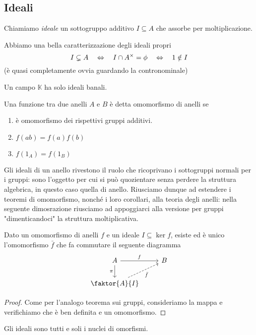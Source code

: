 \begin{multicols}{2}
\subsection{Ideali}
\begin{definition}[ideale]
	Chiamiamo \emph{ideale} un sottogruppo additivo $ I \subseteq A $ che assorbe per moltiplicazione.
\end{definition}

\begin{remark}
	Abbiamo una bella caratterizzazione degli ideali propri
	\[ I \subsetneq A \quad\Leftrightarrow\quad I \cap A^\times = \phi \quad\Leftrightarrow\quad 1 \notin I \]
	(è quasi completamente ovvia guardando la contronominale)
\end{remark}

\begin{remark}
	Un campo $ \mathbb{K} $ ha solo ideali banali.
\end{remark}

\begin{definition}[Omomorfismo]
	Una funzione tra due anelli $ A $ e $ B $ è detta omomorfismo di anelli se
	\begin{enumerate}
		\item è omomorfismo dei rispettivi gruppi additivi.
		\item $ f(ab)=f(a)f(b) $
		\item $ f(1_A)=f(1_B) $
	\end{enumerate}
\end{definition}

\textsf{Gli ideali di un anello rivestono il ruolo che ricoprivano i sottogruppi normali per i gruppi: sono l'oggetto per cui si può quozientare senza perdere la struttura algebrica, in questo caso quella di anello. Riusciamo dunque ad estendere i teoremi di omomorfismo, nonché i loro corollari, alla teoria degli anelli: nella seguente dimosrazione riusciamo ad appoggiarci alla versione per gruppi "dimenticandoci" la struttura moltiplicativa.}

\begin{theorem}[di omomorfismo]\label{omoanelli}
	Dato un omomorfismo di anelli $ f $ e un ideale $ I \subseteq \ker f $, esiste ed è unico l'omomorfismo $ \bar{f} $ che fa commutare il seguente diagramma
	\[ \begin{tikzcd}
	A \arrow{r}{f} \arrow[swap]{d}{\pi} & B \\
	\faktor{A}{I} \arrow[swap, dashed]{ru}{\bar{f}}
	\end{tikzcd} \]
\end{theorem}
\begin{proof}
	Come per l'analogo teorema sui gruppi, consideriamo la mappa
	e verifichiamo che è ben definita e un omomorfismo.
\end{proof}
\begin{remark}
	Gli ideali sono tutti e soli i nuclei di omorfismi.
\end{remark}


\end{multicols}
